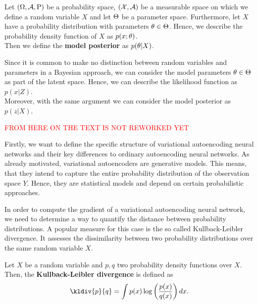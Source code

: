 \begin{definition}\label{def:posterior}
Let $(\Omega,\operatorname{\mathcal{A}}, \operatorname{\text{P}})$ be a probability space, $(\mathcal{X}, \operatorname{\mathcal{A}})$ be a measurable space on which we define a random variable $X$ and let $\operatorname{\Theta}$ be a parameter space. Furthermore, let $X$ have a probability distribution with parameters $\theta\in\operatorname{\Theta}$. Hence, we describe the probability density function of $X$ as $p(x;\theta)$.\\
Then we define the \textbf{model posterior} as $p(\theta | X)$.
\end{definition}

\begin{remark}
Since it is common to make no distinction between random variables and parameters in a Bayesian approach, we can consider the model parameters $\theta\in\operatorname{\Theta}$ as part of the latent space. Hence, we can describe the likelihood function as $p(x|Z)$.\\
Moreover, with the same argument we can consider the model posterior as $p(z|X)$.
\end{remark}


\textcolor{red}{FROM HERE ON THE TEXT IS NOT REWORKED YET}

Firstly, we want to define the specific structure of variational autoencoding neural networks and their key differences to ordinary autoencoding neural networks. As already motivated, variational autoencoders are generative models. This means, that they intend to capture the entire probability distribution of the observation space $Y$. Hence, they are statistical models and depend on certain probabilistic approaches.










In order to compute the gradient of a variational autoencoding neural network, we need to determine a way to quantify the distance between probability distributions. A popular measure for this case is the so called Kullback-Leibler divergence. It assesses the dissimilarity between two probability distributions over the same 	random variable $X$.
\begin{definition}\label{def_kl_div}
Let $X$ be a random variable and $p, q$ two probability density functions over $X$. Then, the \textbf{Kullback-Leibler divergence} is defined as
\begin{align}
\kldiv{p}{q} = \int p(x) \log \left( \frac{p(x)}{q(x)}\right) dx.
\end{align}
\end{definition}

